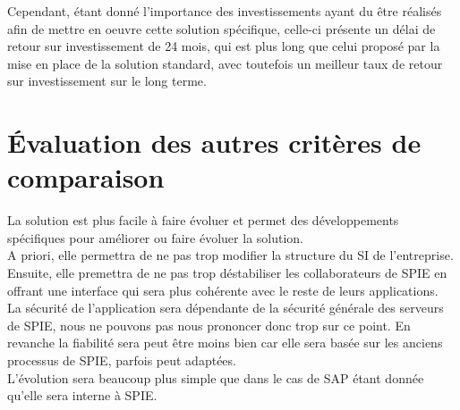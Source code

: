 Cependant, étant donné l’importance des investissements ayant du être réalisés afin de mettre en oeuvre cette solution spécifique, celle-ci présente un délai de retour sur investissement de 24 mois, qui est plus long que celui proposé par la mise en place de la solution standard, avec toutefois un meilleur taux de retour sur investissement sur le long terme.

\section{Évaluation des autres critères de comparaison}

La solution est plus facile à faire évoluer et permet des développements spécifiques pour améliorer ou faire évoluer la solution. \\

A priori, elle permettra de ne pas trop modifier la structure du SI de l’entreprise. Ensuite, elle premettra de ne pas trop déstabiliser les collaborateurs de SPIE en offrant une interface qui sera plus cohérente avec le reste de leurs applications. \\

La sécurité de l’application sera dépendante de la sécurité générale des serveurs de SPIE, nous ne pouvons pas nous prononcer donc trop sur ce point. En revanche la fiabilité sera peut être moins bien car elle sera basée sur les anciens processus de SPIE, parfois peut adaptées. \\

L’évolution sera beaucoup plus simple que dans le cas de SAP étant donnée qu’elle sera interne à SPIE.